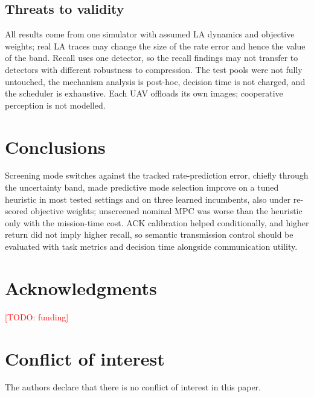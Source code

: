 \documentclass[final,3p,times,twocolumn]{elsarticle}
\newcommand{\todo}[1]{\textcolor{red}{[TODO: #1]}}
\begin{document}
\subsection{Threats to validity}
All results come from one simulator with assumed LA dynamics and objective weights; real LA traces may change the
size of the rate error and hence the value of the band. Recall uses one detector, so the recall findings may not
transfer to detectors with different robustness to compression. The test pools were not fully untouched, the
mechanism analysis is post-hoc, decision time is not charged, and the scheduler is exhaustive. Each UAV offloads its
own images; cooperative perception is not modelled.

\section{Conclusions}\label{sec:conclusion}
Screening mode switches against the tracked rate-prediction error, chiefly through the uncertainty band, made
predictive mode selection improve on a tuned heuristic in most tested settings and on three learned incumbents, also
under re-scored objective weights; unscreened nominal MPC was worse than the heuristic only with the mission-time
cost. ACK calibration helped conditionally, and higher return did not imply higher recall, so semantic transmission
control should be evaluated with task metrics and decision time alongside communication utility.

\section*{Acknowledgments}
\todo{funding}

\section*{Conflict of interest}
The authors declare that there is no conflict of interest in this paper.
\end{document}
